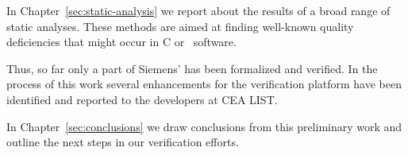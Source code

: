 In Chapter~\ref{sec:static-analysis} we report about the results of a broad range
of static analyses. 
These methods are aimed at finding well-known quality deficiencies that
might occur in C or \CC\ software.

Thus, so far only a part of Siemens' \bitwalker has been formalized and verified.
In the process of this work several enhancements for the \framac verification platform
have been identified and reported to the developers at {CEA LIST}.

In Chapter~\ref{sec:conclusions} we draw conclusions from this preliminary work
and outline the next steps in our verification efforts.

